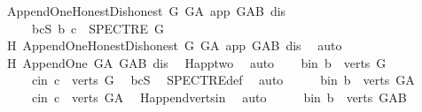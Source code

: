\begin{isabellebody}
\ {\isachardoublequoteopen}Append{\isacharunderscore}{\kern0pt}One{\isacharunderscore}{\kern0pt}Honest{\isacharunderscore}{\kern0pt}Dishonest\ G\ G{\isacharunderscore}{\kern0pt}A\ app\ G{\isacharunderscore}{\kern0pt}AB\ dis{\isachardoublequoteclose}\isanewline
\ \ \ \ \ bcS{\isacharcolon}{\kern0pt}\ {\isachardoublequoteopen}{\isacharparenleft}{\kern0pt}b{\isacharcomma}{\kern0pt}\ c{\isacharparenright}{\kern0pt}\ {\isasymin}\ SPECTRE\ G{\isachardoublequoteclose}\isanewline
\ \ \isamarkupfalse%
\ \isamarkupfalse%
\ H{}{\isacharcolon}{\kern0pt}\ Append{\isacharunderscore}{\kern0pt}One{\isacharunderscore}{\kern0pt}Honest{\isacharunderscore}{\kern0pt}Dishonest\ G\ G{\isacharunderscore}{\kern0pt}A\ app\ G{\isacharunderscore}{\kern0pt}AB\ dis\ \isamarkupfalse%
\ auto\isanewline
\ \ \isamarkupfalse%
\ H{}{\isacharcolon}{\kern0pt}\ Append{\isacharunderscore}{\kern0pt}One\ G{\isacharunderscore}{\kern0pt}A\ G{\isacharunderscore}{\kern0pt}AB\ dis\ \isamarkupfalse%
\ H{}{\isachardot}{\kern0pt}app{\isacharunderscore}{\kern0pt}two\ \isamarkupfalse%
\ auto\isanewline
\ \ \isamarkupfalse%
\ b{\isacharunderscore}{\kern0pt}in{\isacharcolon}{\kern0pt}\ {\isachardoublequoteopen}b\ {\isasymin}\ verts\ G{\isachardoublequoteclose}\isanewline
\ \ \ \ \ c{\isacharunderscore}{\kern0pt}in{\isacharcolon}{\kern0pt}\ {\isachardoublequoteopen}c\ {\isasymin}\ verts\ G{\isachardoublequoteclose}\ \isamarkupfalse%
\ bcS\ \isamarkupfalse%
\ SPECTRE{\isacharunderscore}{\kern0pt}def\ \isamarkupfalse%
\ auto\isanewline
\ \ \isamarkupfalse%
\ \isamarkupfalse%
\ b{\isacharunderscore}{\kern0pt}in{}{\isacharcolon}{\kern0pt}\ {\isachardoublequoteopen}b\ {\isasymin}\ verts\ G{\isacharunderscore}{\kern0pt}A{\isachardoublequoteclose}\isanewline
\ \ \ \ \ c{\isacharunderscore}{\kern0pt}in{}{\isacharcolon}{\kern0pt}\ {\isachardoublequoteopen}c\ {\isasymin}\ verts\ G{\isacharunderscore}{\kern0pt}A{\isachardoublequoteclose}\ \isamarkupfalse%
\ H{}{\isachardot}{\kern0pt}append{\isacharunderscore}{\kern0pt}verts{\isacharunderscore}{\kern0pt}in\ \isamarkupfalse%
\ auto\isanewline
\ \ \isamarkupfalse%
\ \isamarkupfalse%
\ b{\isacharunderscore}{\kern0pt}in{}{\isacharcolon}{\kern0pt}\ {\isachardoublequoteopen}b\ {\isasymin}\ verts\ G{\isacharunderscore}{\kern0pt}AB{\isachardoublequoteclose}\isanewline

\end{isabellebody}
